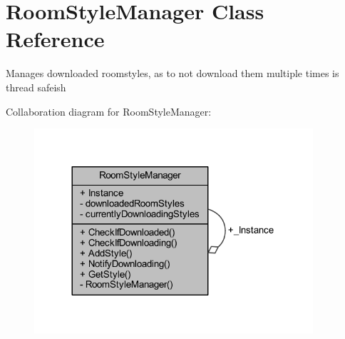 \hypertarget{class_room_style_manager}{}\section{Room\+Style\+Manager Class Reference}
\label{class_room_style_manager}


Manages downloaded roomstyles, as to not download them multiple times is thread safeish  




Collaboration diagram for Room\+Style\+Manager\+:
\nopagebreak
\begin{figure}[H]
\begin{center}
\leavevmode
\includegraphics[width=293pt]{class_room_style_manager__coll__graph}
\end{center}
\end{figure}

